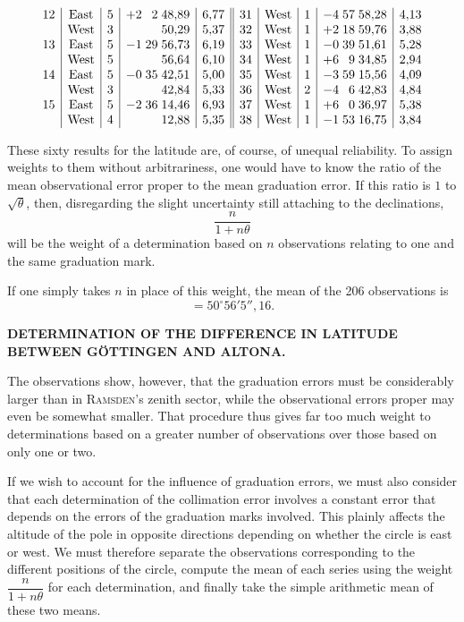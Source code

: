 {\[\begin{array}{@{}r|c|c|r@{\;}r@{\;}r|r||r|c|c|r@{\;}r@{\;}r|r@{}}
12&\text{East}&5&+2&2&48{,}89&6{,}77&31&\text{West}&1&-4&57&58{,}28&4{,}13\\
&\text{West}&3&&&50{,}29&5{,}37&32&\text{West}&1&+2&18&59{,}76&3{,}88\\
13&\text{East}&5&-1&29&56{,}73&6{,}19&33&\text{West}&1&-0&39&51{,}61&5{,}28\\
&\text{West}&5&&&56{,}64&6{,}10&34&\text{West}&1&+6&9&34{,}85&2{,}94\\
14&\text{East}&5&-0&35&42{,}51&5{,}00&35&\text{West}&1&-3&59&15{,}56&4{,}09\\
&\text{West}&3&&&42{,}84&5{,}33&36&\text{West}&2&-4&6&42{,}83&4{,}84\\
15&\text{East}&5&-2&36&14{,}46&6{,}93&37&\text{West}&1&+6&0&36{,}97&5{,}38\\
&\text{West}&4&&&12{,}88&5{,}35&38&\text{West}&1&-1&53&16{,}75&3{,}84
\end{array}
\]
\par
}

These sixty results for the latitude are, of course, of unequal reliability.
To assign weights to them without arbitrariness, one would have to know the ratio
of the mean observational error proper to the mean graduation error. If this ratio
is \(1\) to \(\surd\theta\), then, disregarding the slight uncertainty still
attaching to the declinations,
\[
\frac n{1+n\theta}
\]
\noindent will be the weight of a determination based on \(n\) observations
relating to one and the same graduation mark.

If one simply takes \(n\) in place of this weight, the mean of the 206
observations is
\[
=50^\circ56'5''{,}16.
\]

\par\clearpage
\noindent{}\parbox[t]{\dimexpr\linewidth-24mm\relax}{\centering\scriptsize\bfseries DETERMINATION OF THE DIFFERENCE IN LATITUDE BETWEEN GÖTTINGEN AND ALTONA.}\makebox[12mm][r]{}\par\medskip

The observations show, however, that the graduation errors must be considerably
larger than in \textsc{Ramsden}'s zenith sector, while the observational errors
proper may even be somewhat smaller. That procedure thus gives far too much
weight to determinations based on a greater number of observations over those
based on only one or two.

If we wish to account for the influence of graduation errors, we must also consider
that each determination of the collimation error involves a constant error that
depends on the errors of the graduation marks involved. This plainly affects the
altitude of the pole in opposite directions depending on whether the circle is
east or west. We must therefore separate the observations corresponding to the
different positions of the circle, compute the mean of each series using the
weight \(\dfrac n{1+n\theta}\) for each determination, and finally take the simple
arithmetic mean of these two means.

